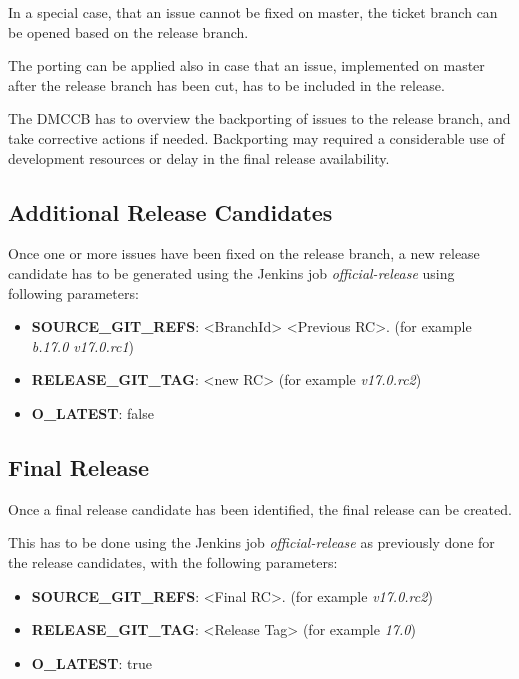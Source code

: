 In a special case, that an issue cannot be fixed on master, the ticket branch can be opened based on the release branch.

The porting can be applied also in case that an issue, implemented on master after the release branch has been cut, has to be included in the release.

The DMCCB has to overview the backporting of issues to the release branch, and take corrective actions if needed. Backporting may required a considerable use of development resources or delay in the final release availability.

\subsection{Additional Release Candidates} \label{sect:newrc}

Once one or more issues have been fixed on the release branch, a new release candidate has to be generated using the Jenkins job \textit{official-release} using following parameters:

\begin{itemize}
\item {\bf SOURCE\_GIT\_REFS}: <BranchId> <Previous RC>. (for example \textit{b.17.0 v17.0.rc1})
\item {\bf RELEASE\_GIT\_TAG}: <new RC> (for example \textit{v17.0.rc2})
\item {\bf O\_LATEST}: false
\end{itemize}

\subsection{Final Release} \label{sect:finalrelease}

Once a final release candidate has been identified, the final release can be created.

This has to be done using the Jenkins job \textit{official-release} as previously done for the release candidates, with the following parameters:

\begin{itemize}
\item {\bf SOURCE\_GIT\_REFS}: <Final RC>. (for example \textit{v17.0.rc2})
\item {\bf RELEASE\_GIT\_TAG}: <Release Tag> (for example \textit{17.0})
\item {\bf O\_LATEST}: true
\end{itemize}

\newpage

